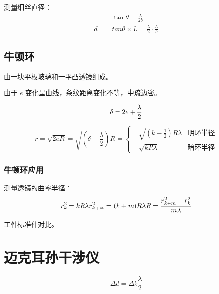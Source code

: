 测量细丝直径：
\begin{equation}
    \begin{aligned}
           & \tan{\theta}=\frac{\lambda}{2b}                            \\
        d= & tan{\theta{}}\times{}L=\frac{\lambda}{2}\cdot{}\frac{L}{b}
    \end{aligned}
\end{equation}

\subsection{牛顿环}

由一块平板玻璃和一平凸透镜组成。

由于 $e$ 变化呈曲线，条纹距离变化不等，中疏边密。

\begin{equation}
    \delta=2e+\frac{\lambda}{2}\\
\end{equation}

\begin{equation}
    r=\sqrt{2eR}=\sqrt{(\delta-\frac{\lambda}{2})R}=
    \left\{
    \begin{aligned}
         & \sqrt{(k-\frac{1}{2})R\lambda} & \mbox{明环半径} \\
         & \sqrt{kR\lambda}               & \mbox{暗环半径}
    \end{aligned}
    \right.
\end{equation}

\subsubsection{牛顿环应用}

测量透镜的曲率半径：
\begin{equation}
    r_k^2=kR\lambda\\
    r_{k+m}^2=(k+m)R\lambda\\
    R=\frac{r_{k+m}^2-r_k^2}{m\lambda}
\end{equation}

工件标准件对比。

\section{迈克耳孙干涉仪}

\begin{equation}
    \Delta{d}=\Delta{k}\frac{\lambda}{2}
\end{equation}

